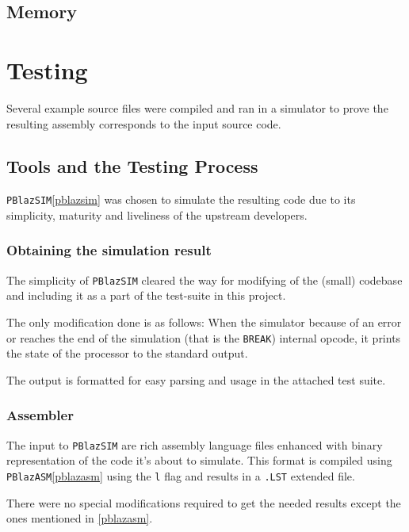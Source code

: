         \subsection{Memory}

    \section{Testing}

    Several example source files were compiled and ran in a simulator to prove the resulting assembly corresponds to the input source code.

        \subsection{Tools and the Testing Process}

        \texttt{PBlazSIM}\ref{pblazsim} was chosen to simulate the resulting code due to its simplicity, maturity and liveliness of the upstream developers. 

            \subsubsection{Obtaining the simulation result}

                The simplicity of \texttt{PBlazSIM} cleared the way for modifying of the (small) codebase and including it as a part of the test-suite in this project.

                The only modification done is as follows: When the simulator because of an error or reaches the end of the simulation (that is the \texttt{BREAK}) internal opcode, it prints the state of the processor to the standard output.

                The output is formatted for easy parsing and usage in the attached test suite.

            \subsubsection{Assembler}

                The input to \texttt{PBlazSIM} are rich assembly language files enhanced with binary representation of the code it's about to simulate. This format is compiled using \texttt{PBlazASM}\ref{pblazasm} using the \texttt{\-l} flag and results in a \texttt{.LST} extended file.

                There were no special modifications required to get the needed results except the ones mentioned in \ref{pblazasm}.

